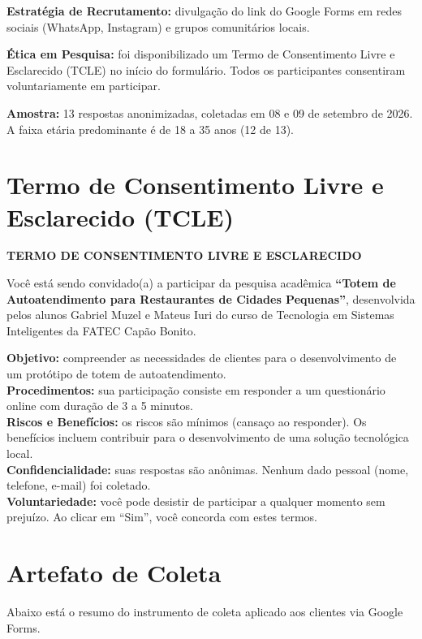 \documentclass[12pt, oneside, a4paper, chapter=TITLE,section=TITLE]{abntex2}
\begin{document}
\textbf{Estratégia de Recrutamento:} divulgação do link do Google Forms em redes sociais (WhatsApp, Instagram) e grupos comunitários locais.

\textbf{Ética em Pesquisa:} foi disponibilizado um Termo de Consentimento Livre e Esclarecido (TCLE) no início do formulário. Todos os participantes consentiram voluntariamente em participar.

\textbf{Amostra:} 13 respostas anonimizadas, coletadas em 08 e 09 de setembro de 2026. A faixa etária predominante é de 18 a 35 anos (12 de 13).

\section{Termo de Consentimento Livre e Esclarecido (TCLE)}

\noindent\textbf{TERMO DE CONSENTIMENTO LIVRE E ESCLARECIDO}

Você está sendo convidado(a) a participar da pesquisa acadêmica \textbf{``Totem de Autoatendimento para Restaurantes de Cidades Pequenas''}, desenvolvida pelos alunos Gabriel Muzel e Mateus Iuri do curso de Tecnologia em Sistemas Inteligentes da FATEC Capão Bonito.

\textbf{Objetivo:} compreender as necessidades de clientes para o desenvolvimento de um protótipo de totem de autoatendimento. \\
\textbf{Procedimentos:} sua participação consiste em responder a um questionário online com duração de 3 a 5 minutos. \\
\textbf{Riscos e Benefícios:} os riscos são mínimos (cansaço ao responder). Os benefícios incluem contribuir para o desenvolvimento de uma solução tecnológica local. \\
\textbf{Confidencialidade:} suas respostas são anônimas. Nenhum dado pessoal (nome, telefone, e-mail) foi coletado. \\
\textbf{Voluntariedade:} você pode desistir de participar a qualquer momento sem prejuízo. Ao clicar em ``Sim'', você concorda com estes termos.

\section{Artefato de Coleta}

Abaixo está o resumo do instrumento de coleta aplicado aos clientes via Google Forms.
\end{document}
